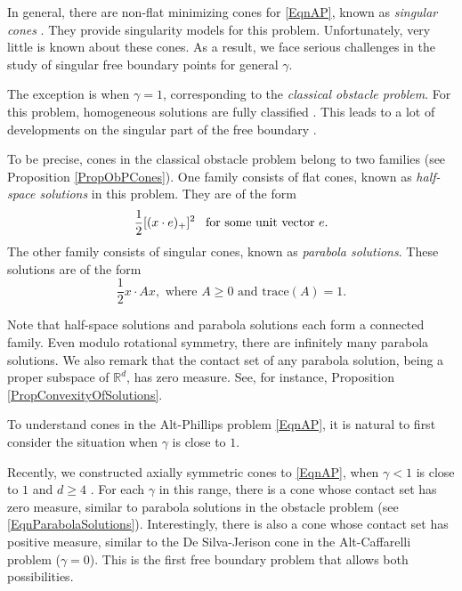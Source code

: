 \documentclass{amsart}
\def\R {\mathbb{R}}
\def\hem{\hspace{0.5em}}
\def\vem{\vspace{0.6em}}
\theoremstyle{definition}
\numberwithin{equation}{section}
\theoremstyle{remark}
\begin{document}
In general, there are non-flat minimizing cones for \eqref{EqnAP}, known as \textit{singular cones} \cite{DJ, SY2}. They provide singularity models for this problem. Unfortunately, very little is known about these cones. As a result, we face  serious challenges in the study of singular  free boundary points for general $\gamma$. 

\vem

The exception is when $\gamma=1$, corresponding to the \textit{classical obstacle problem}. For this problem, homogeneous solutions are fully classified \cite{C, PSU}. This leads to  a lot of developments on the singular part of the free boundary \cite{C, CSV, FRoSe, FSe, L, M, SY1}.  

To be precise, cones in the classical obstacle problem belong to two families (see Proposition \ref{PropObPCones}). One family consists of flat cones, known as \textit{half-space solutions} in this problem. They are of the form  
\begin{equation}
\label{EqnHalfSpaceSolutions}
\frac12[(x\cdot e)_+]^2\hem \text{ for some unit vector }e.
\end{equation} 
The other family consists of singular cones,  known as \textit{parabola solutions}. These solutions are of the form 
\begin{equation}
\label{EqnParabolaSolutions}
\frac12x\cdot Ax, \text{ where  }A\ge0 \text{ and }\mathrm{trace}(A)=1.
\end{equation}

Note that half-space solutions and parabola solutions each form a connected family. Even modulo rotational symmetry, there are infinitely many parabola solutions. We also remark that the contact set of any parabola solution, being a proper subspace of $\R^d$,  has zero measure. See, for instance, Proposition \ref{PropConvexityOfSolutions}. 

\vem

To understand cones in the Alt-Phillips problem \eqref{EqnAP}, it is natural to first consider the situation when $\gamma$ is close to $1$. 

Recently, we constructed axially symmetric cones to \eqref{EqnAP}, when  $\gamma<1$ is close to $1$ and $d\ge4$ \cite{SY2}. For each $\gamma$ in this range, there is a cone whose contact set has zero measure, similar to parabola solutions in the obstacle problem (see \eqref{EqnParabolaSolutions}). Interestingly, there is also a cone whose contact set has positive measure, similar to the De Silva-Jerison cone \cite{DJ} in the Alt-Caffarelli problem ($\gamma=0$). This is the first free boundary problem that allows both possibilities. 
\end{document}
